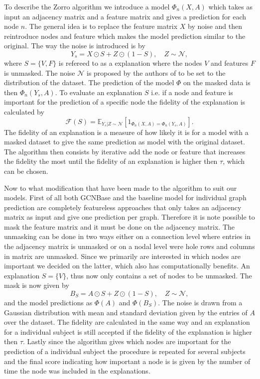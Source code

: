 To describe the Zorro algorithm we introduce a model $\Phi_n(X,A)$ which takes as input an adjacency matrix and a feature matrix and gives a prediction for each node $n$. The general idea is to replace the feature matrix $X$ by noise and then reintroduce nodes and feature which makes the model prediction similar to the original. The way the noise is introduced is by 
\begin{equation*}
    Y_s = X \odot S + Z \odot (1- S), \quad Z \sim \mathcal{N}, 
\end{equation*}
where $S = \{V, F\}$ is refereed to as a explanation where the nodes $V$ and features $F$ is unmasked. The noise $\mathcal{N}$ is proposed by the authors of \cite{} to be set to the distribution of the dataset. The prediction of the model $\Phi$ on the masked data is then $\Phi_n(Y_s, A)$. To evaluate an explanation $S$ i.e. if a node and feature is important for the prediction of a specific node the fidelity of the explanation is calculated by
\begin{equation*}
    \mathcal{F}(S) = \mathbb{E}_{Y_s|Z\sim\mathcal{N}}[1_{\Phi_n(X,A) = \Phi_n(Y_s,A)}].
\end{equation*}
The fidelity of an explanation is a measure of how likely it is for a model with a masked dataset to give the same prediction as model with the original dataset. The algorithm then consists by iterative add the node or feature that increases the fidelity the most until the fidelity of an explanation is higher then $\tau$, which can be chosen.

Now to what modification that have been made to the algorithm to suit our models. First of all both GCNBase and the baseline model for individual graph prediction are completely featureless approaches that only takes an adjacency matrix as input and give one prediction per graph. Therefore it is note possible to mask the feature matrix and it must be done on the adjacency matrix. The unmasking can be done in two ways either on a connection level where entries in the adjacency matrix is unmasked or on a nodal level were hole rows and columns in matrix are unmasked. Since we primarily are interested in which nodes are important we decided on the latter, which also has computationally benefits. An explanation $S = \{V\}$, thus now only contains a set of nodes to be unmasked. The mask is now given by 
\begin{equation*}
    B_S = A \odot S + Z \odot (1- S), \quad Z \sim \mathcal{N},
\end{equation*}
and the model predictions as $\Phi(A)$ and $\Phi(B_S)$. The noise is drawn from a Gaussian distribution with mean and standard deviation given by the entries of $A$ over the dataset. The fidelity are calculated in the same way and an explanation for a individual subject is still accepted if the fidelity of the explanation is higher then $\tau$. Lastly since the algorithm gives which nodes are important for the prediction of a individual subject the procedure is repeated for several subjects and the final score indicating how important a node is is given by the number of time the node was included in the explanations. 


